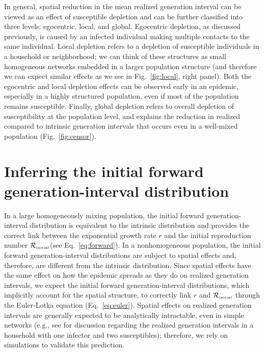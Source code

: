 \documentclass[12pt]{article}
\newcommand{\eref}[1]{Eq.~\ref{eq:#1}}
\newcommand{\fref}[1]{Fig.~\ref{fig:#1}}
\newcommand{\Rx}[1]{\ensuremath{{\mathcal R}_{#1}}\xspace}
\newcommand{\Rini}{\Rx{\textrm{\tiny initial}}}
\begin{document}
In general, spatial reduction in the mean realized generation interval can be viewed as an effect of susceptible depletion and can be further classified into three levels: egocentric, local, and global.
Egocentric depletion, as discussed previously, is caused by an infected individual making multiple contacts to the same individual.
Local depletion refers to a depletion of susceptible individuals in a household or neighborhood;
we can think of these structures as small homogeneous networks embedded in a larger population structure (and therefore we can expect similar effects as we see in \fref{local}, right panel).
Both the egocentric and local depletion effects can be observed early in an epidemic, especially in a highly structured population, even if most of the population remains susceptible.
Finally, global depletion refers to overall depletion of susceptibility at the population level, and explains the reduction in realized compared to intrinsic generation intervals that occurs even in a well-mixed population (\fref{censor}). 

\section{Inferring the initial forward generation-interval distribution}

In a large homogeneously mixing population, the initial forward generation-interval distribution is equivalent to the intrinsic distribution and provides the correct link between the exponential growth rate $r$ and the initial reproduction number \Rini (see \eref{forward}).
In a nonhomogeneous population, the initial forward generation-interval distributions are subject to spatial effects and, therefore, are different from the intrinsic distribution.
Since spatial effects have the same effect on how the epidemic spreads as they do on realized generation intervals, we expect the initial forward generation-interval distributions, which implicitly account for the spatial structure, to correctly link $r$ and $\Rini$ through the Euler-Lotka equation (\eref{euler}).
Spatial effects on realized generation intervals are generally expected to be analytically intractable, even in simple networks (e.g., see \cite{tomba2010some} for discussion regarding the realized generation intervals in a household with one infector and two susceptibles); therefore, we rely on simulations to validate this prediction.
\end{document}
